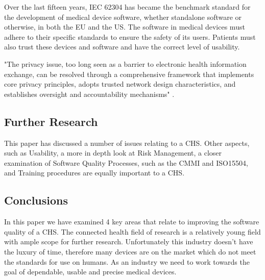 Over the last fifteen years, IEC 62304 has became the benchmark standard for the development of medical device software, whether standalone software or otherwise, in both the EU and the US. The software in medical devices must adhere to their specific standards to ensure the safety of its users. Patients must also trust these devices and software and have the correct level of usability.

"The privacy issue, too long seen as a barrier to electronic health information exchange, can be resolved through a comprehensive framework that implements core privacy principles, adopts trusted network design characteristics, and establishes oversight and accountability mechanisms" \parencite{privacy}.

\subsection{Further Research}

This paper has discussed a number of issues relating to a CHS. Other aspects, such as Usability, a more in depth look at Risk Management, a closer examination of Software Quality Processes, such as the CMMI and ISO15504, and Training procedures are equally important to a CHS. 

\subsection{Conclusions}

In this paper we have examined 4 key areas that relate to improving the software quality of a CHS. The connected health field of research is a relatively young field with ample scope for further research. Unfortunately this industry doesn't have the luxury of time, therefore many devices are on the market which do not meet the standards for use on humans. As an industry we need to work towards the goal of dependable, usable and precise medical devices.